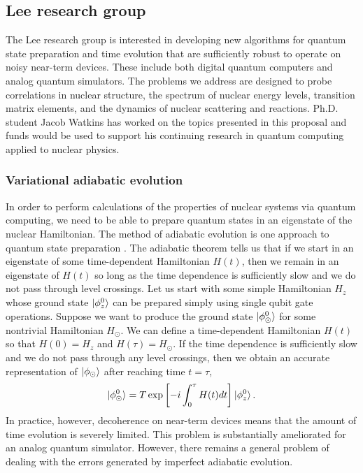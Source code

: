 \documentclass[aps,longbibliography,final,prl,onecolumn,superscriptaddress,nofootinbib,floatfix,11pt]{revtex4-1}
\begin{document}
\noindent

\subsection{Lee research group}
The Lee research group is interested in developing new algorithms for quantum state preparation and time evolution that are sufficiently robust to operate on noisy near-term devices.  These include both digital quantum computers and analog quantum simulators.  The problems we address are designed to probe correlations in nuclear structure, the spectrum of nuclear energy levels, transition matrix elements, and the dynamics of nuclear scattering and reactions.  Ph.D. student Jacob Watkins has worked on the topics presented in this proposal and funds would be used to support his continuing research in quantum computing applied to nuclear physics.  

 
\subsubsection{Variational adiabatic evolution}



In order to perform calculations of the properties of nuclear systems via quantum computing, we need to be able to prepare quantum states in an eigenstate of the nuclear Hamiltonian. The method of adiabatic evolution is one approach to quantum 
 state preparation \cite{Farhi:2000a}.  The adiabatic theorem tells us that if we start in an eigenstate of some time-dependent Hamiltonian $H(t)$, then we remain in an eigenstate of $H(t)$ so long as the time dependence is sufficiently slow and we do not pass through level crossings.  Let us start with some simple Hamiltonian $H_z$ whose ground state $\ket{\phi^0_z}$  can be prepared simply using single qubit gate operations. Suppose we want to produce the
ground state $\ket{\phi^{0}_\odot}$ for some nontrivial Hamiltonian $H_\odot$.  We can define a time-dependent Hamiltonian $H(t)$ so that $H(0)=H_z$ and $H(\tau)=H_\odot$.  If the time dependence is sufficiently slow
and we do not pass through any level crossings, then we obtain an accurate representation of $\ket{\phi_\odot}$ after reaching time $t = \tau$,
\begin{equation}
\ket{\phi_\odot^0} = T \exp\left[-i\int_0^\tau H(t) dt \right]\ket{\phi_z^{0}}.
\end{equation}  In practice, however, decoherence on near-term devices means that the amount of time evolution is severely limited.  This problem is substantially ameliorated for an analog quantum simulator.  However, there remains a general problem of dealing with the errors generated by imperfect adiabatic evolution.    
\end{document}
